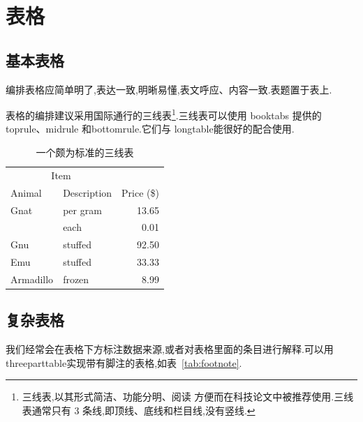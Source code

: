 \documentclass[a4paper,punct=banjiao,twoside]{ctexrep}
\theoremstyle{plain}
\theoremstyle{definition}
\theoremstyle{remark}
\begin{document}
\section{表格}

\subsection{基本表格}

编排表格应简单明了,表达一致,明晰易懂,表文呼应、内容一致.表题置于表上.

表格的编排建议采用国际通行的三线表\footnote{三线表,以其形式简洁、功能分明、阅读
方便而在科技论文中被推荐使用.三线表通常只有 3 条线,即顶线、底线和栏目线,没有竖线.}.三线表可以使用 booktabs 提供的 toprule、midrule 和bottomrule.它们与 longtable能很好的配合使用.

\begin{table}[!hpt]
  \caption[一个颇为标准的三线表]{一个颇为标准的三线表\footnotemark}
  \label{tab:firstone}
  \centering
  \begin{tabular}{@{}llr@{}} \toprule
    \multicolumn{2}{c}{Item} \\ \cmidrule(r){1-2}
    Animal & Description & Price (\$)\\ \midrule
    Gnat  & per gram  & 13.65 \\
          & each      & 0.01 \\
    Gnu   & stuffed   & 92.50 \\
    Emu   & stuffed   & 33.33 \\
    Armadillo & frozen & 8.99 \\ \bottomrule
  \end{tabular}
\end{table}
\subsection{复杂表格}

我们经常会在表格下方标注数据来源,或者对表格里面的条目进行解释.可以用threeparttable实现带有脚注的表格,如表~\ref{tab:footnote}.
\end{document}
